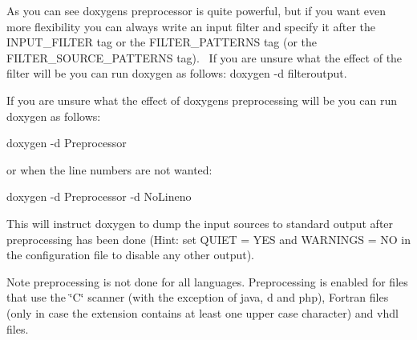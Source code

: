 As you can see doxygen\textquotesingle{}s preprocessor is quite powerful, but if you want even more flexibility you can always write an input filter and specify it after the I\+N\+P\+U\+T\+\_\+\+F\+I\+L\+T\+ER tag or the F\+I\+L\+T\+E\+R\+\_\+\+P\+A\+T\+T\+E\+R\+NS tag (or the F\+I\+L\+T\+E\+R\+\_\+\+S\+O\+U\+R\+C\+E\+\_\+\+P\+A\+T\+T\+E\+R\+NS tag).~\newline
 If you are unsure what the effect of the filter will be you can run doxygen as follows\+: {\ttfamily doxygen -\/d filteroutput}.

If you are unsure what the effect of doxygen\textquotesingle{}s preprocessing will be you can run doxygen as follows\+: \begin{DoxyVerb}  doxygen -d Preprocessor
\end{DoxyVerb}
 or when the line numbers are not wanted\+: \begin{DoxyVerb}  doxygen -d Preprocessor -d NoLineno
\end{DoxyVerb}
 This will instruct doxygen to dump the input sources to standard output after preprocessing has been done (Hint\+: set {\ttfamily Q\+U\+I\+ET = Y\+ES} and {\ttfamily W\+A\+R\+N\+I\+N\+GS = NO} in the configuration file to disable any other output).

Note preprocessing is not done for all languages. Preprocessing is enabled for files that use the \char`\"{}\+C\char`\"{} scanner (with the exception of \textquotesingle{}java\textquotesingle{}, \textquotesingle{}d\textquotesingle{} and \textquotesingle{}php\textquotesingle{}), Fortran files (only in case the extension contains at least one upper case character) and vhdl files.

 